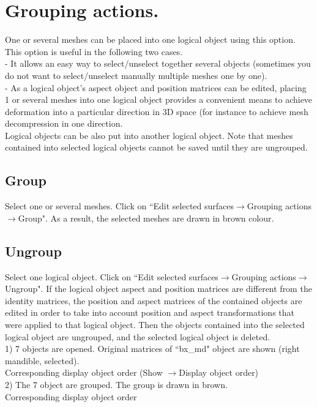 \section{Grouping actions.}
One or several meshes can be placed into one logical object using this option. This option is useful in the following two cases.\\
- It allows an easy way to select/unselect together several objects (sometimes you do not want
to select/unselect manually multiple meshes one by one).\\
- As a logical object’s aspect object and position matrices can be edited, placing 1 or several
meshes into one logical object provides a convenient means to achieve deformation into
a particular direction in 3D space (for instance to achieve mesh decompression in one
direction.\\
Logical objects can be also put into another logical object. Note that meshes contained into selected logical objects cannot be saved until they are ungrouped.

\subsection{Group}
Select one or several meshes. Click on ``Edit selected surfaces$\rightarrow$Grouping actions$\rightarrow$Group". As a result, the selected meshes are drawn in brown colour.
\subsection{Ungroup}
Select one logical object. Click on ``Edit selected surfaces$\rightarrow$Grouping actions$\rightarrow$Ungroup". If the logical object aspect and position matrices are different from the identity matrices, the position and aspect matrices of the contained objects are edited in order to take into account position and aspect transformations that were applied to that logical object. Then the objects contained into the selected logical object are ungrouped, and the selected logical object is deleted.\\

1) 7 objects are opened. Original matrices of ``bx\_md" object are shown (right mandible, selected).\\
Corresponding display object order (Show $\rightarrow$Display object order)\\
2) The 7 object are grouped. The group is drawn in brown. \\
Corresponding display object order\\

